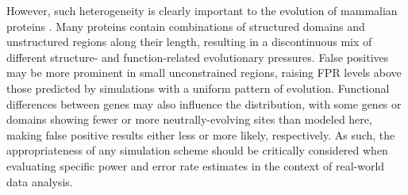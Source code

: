However, such heterogeneity is clearly important to the evolution of
mammalian proteins \citep{Fay2003}. Many proteins contain combinations
of structured domains and unstructured regions along their length,
resulting in a discontinuous mix of different structure- and
function-related evolutionary pressures. False positives may be more
prominent in small unconstrained regions, raising FPR levels above
those predicted by simulations with a uniform pattern of
evolution. Functional differences between genes may also influence the
\omg distribution, with some genes or domains showing fewer or more
neutrally-evolving sites than modeled here, making false positive
results either less or more likely, respectively. As such, the
appropriateness of any simulation scheme should be critically
considered when evaluating specific power and error rate estimates in
the context of real-world data analysis.



